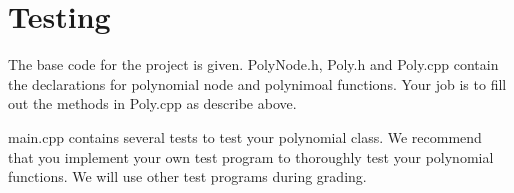 \documentclass[10pt,dvipdfm]{article}
\begin{document}
\section{Testing}
%
The base code for the project is given.
PolyNode.h, Poly.h and Poly.cpp contain the declarations for polynomial node and polynimoal functions.
Your job is to fill out the methods in Poly.cpp as describe above. 

main.cpp contains several tests to test your polynomial class.
We recommend that you implement your own test program to thoroughly
test your polynomial functions. We will use other test programs during grading.

%
\end{document}
